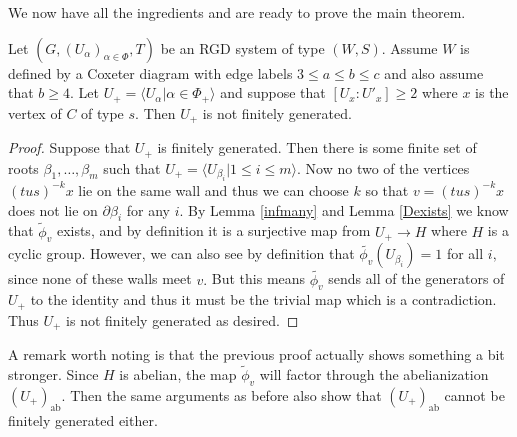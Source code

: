 \documentclass[class=book, crop=false,12 pt]{standalone}
\begin{document}
We now have all the ingredients and are ready to prove the main theorem.

\begin{theorem}
	\label{notfinitelygenerated}
	Let $(G,(U_\alpha)_{\alpha\in \Phi},T)$ be an RGD system of type $(W,S).$ Assume $W$ is defined by a Coxeter diagram with edge labels $3\le a\le b\le c$ and also assume that $b\ge 4.$ Let $U_+=\langle U_\alpha|\alpha\in \Phi_+\rangle$ and suppose that $[U_x:U'_x]\ge 2$ where $x$ is the vertex of $C$ of type $s.$ Then $U_+$ is not finitely generated.
\end{theorem}
\begin{proof}
Suppose that $U_+$ is finitely generated. Then there is some finite set of roots $\beta_1,\dots,\beta_m$ such that $U_+=\langle U_{\beta_i}|1\le i\le m\rangle.$ Now no two of the vertices $(tus)^{-k}x$ lie on the same wall and thus we can choose $k$ so that $v=(tus)^{-k}x$ does not lie on $\partial \beta_i$ for any $i.$ By Lemma \ref{infmany} and Lemma \ref{Dexists} we know that $\tilde{\phi}_v$ exists, and by definition it is a surjective map from $U_+\to H$ where $H$ is a cyclic group. However, we can also see by definition that $\tilde{\phi_v}(U_{\beta_i})=1$ for all $i,$ since none of these walls meet $v.$ But this means $\tilde{\phi_v}$ sends all of the generators of $U_+$ to the identity and thus it must be the trivial map which is a contradiction. Thus $U_+$ is not finitely generated as desired.
\end{proof}

A remark worth noting is that the previous proof actually shows something a bit stronger. Since $H$ is abelian, the map $\tilde{\phi}_v$ will factor through the abelianization $(U_+)_{\text{ab}}.$ Then the same arguments as before also show that $(U_+)_{\text{ab}}$ cannot be finitely generated either.
\end{document}
